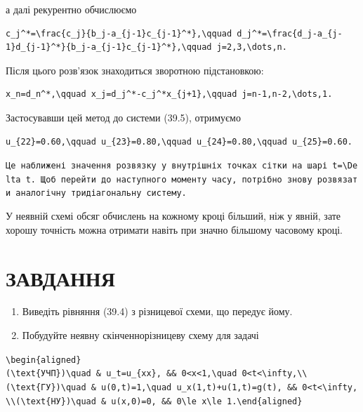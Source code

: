 \documentclass[
  ukrainian,
]{article}
\begin{document}
а далі рекурентно обчислюємо

\begin{verbatim}
c_j^*=\frac{c_j}{b_j-a_{j-1}c_{j-1}^*},\qquad d_j^*=\frac{d_j-a_{j-1}d_{j-1}^*}{b_j-a_{j-1}c_{j-1}^*},\qquad j=2,3,\dots,n.
\end{verbatim}

Після цього розв'язок знаходиться зворотною підстановкою:

\begin{verbatim}
x_n=d_n^*,\qquad x_j=d_j^*-c_j^*x_{j+1},\qquad j=n-1,n-2,\dots,1.
\end{verbatim}

Застосувавши цей метод до системи (39.5), отримуємо

\begin{verbatim}
u_{22}=0.60,\qquad u_{23}=0.80,\qquad u_{24}=0.80,\qquad u_{25}=0.60.
\end{verbatim}

\texttt{Це\ наближені\ значення\ розв\textquotesingle{}язку\ у\ внутрішніх\ точках\ сітки\ на\ шарі\ \textquotesingle{}t=\textbackslash{}Delta\ t\textquotesingle{}.\ Щоб\ перейти\ до\ наступного\ моменту\ часу,\ потрібно\ знову\ розв\textquotesingle{}язати\ аналогічну\ тридіагональну\ систему.}

У неявній схемі обсяг обчислень на кожному кроці більший, ніж у явній,
зате хорошу точність можна отримати навіть при значно більшому часовому
кроці.

\section{ЗАВДАННЯ}\label{ux437ux430ux432ux434ux430ux43dux43dux44f-11}

\begin{enumerate}
\def\labelenumi{\arabic{enumi}.}
\item
  Виведіть рівняння (39.4) з різницевої схеми, що передує йому.
\item
  Побудуйте неявну скінченнорізницеву схему для задачі
\end{enumerate}

\texttt{\textbackslash{}begin\{aligned\}(\textbackslash{}text\{УЧП\})\textbackslash{}quad\ \&\ u\_t=u\_\{xx\},\ \&\&\ 0\textless{}x\textless{}1,\textbackslash{}quad\ 0\textless{}t\textless{}\textbackslash{}infty,\textbackslash{}\textbackslash{}(\textbackslash{}text\{ГУ\})\textbackslash{}quad\ \&\ u(0,t)=1,\textbackslash{}quad\ u\_x(1,t)+u(1,t)=g(t),\ \&\&\ 0\textless{}t\textless{}\textbackslash{}infty,\textbackslash{}\textbackslash{}(\textbackslash{}text\{НУ\})\textbackslash{}quad\ \&\ u(x,0)=0,\ \&\&\ 0\textbackslash{}le\ x\textbackslash{}le\ 1.\textbackslash{}end\{aligned\}}
\end{document}
